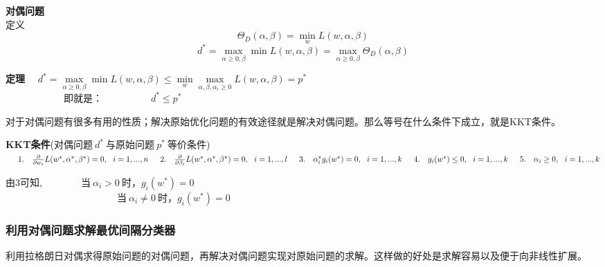 \textbf{对偶问题} ~~\\
\indent 定义
$$\Theta_D(\alpha,\beta)=\min \limits_w L(w,\alpha,\beta)$$
$$d^* = \max \limits_{\alpha\geq0,\beta} \min L(w,\alpha,\beta) = \max\limits_{\alpha\geq0,\beta} \Theta_D(\alpha,\beta)$$

\textbf{定理} ~~$d^* = \max \limits_{\alpha\geq0,\beta} \min L(w,\alpha,\beta)\leq \min \limits_w \max \limits_{\alpha,\beta,\alpha_i\geq0} L(w,\alpha,\beta) = p^*$ \\
\indent~~~~~~~~~~~~即就是：~~~~~~~~~~$d^*\leq p^*$

对于对偶问题有很多有用的性质；解决原始优化问题的有效途径就是解决对偶问题。那么等号在什么条件下成立，就是KKT条件。

\textbf{KKT条件}(对偶问题$~d^*~$与原始问题$~p^*~$等价条件)\\
$
\indent1.~~~\frac{\partial}{\partial w_i}L(w^*,\alpha^*,\beta^*) =0,~~i=1,...,n   \\
\indent2.~~~\frac{\partial}{\partial \beta_i}L(w^*,\alpha^*,\beta^*) =0,~~i=1,...,l  \\
\indent3.~~~\alpha_i^*g_i(w^*)=0,~~i=1,...,k\\
\indent4.~~~g_i(w^*)\leq0,~~i=1,...,k \\
\indent5.~~~\alpha_i\geq0,~~i=1,...,k
$

由3可知,~~~~~~~~当$~\alpha_i>0~$时，$g_i(w^*)=0$\\
\indent ~~~~~~~~~~~~~~~~~~~~~~~当$~\alpha_i\neq0~$时，$g_i(w^*)=0$

\subsubsection{利用对偶问题求解最优间隔分类器}
利用拉格朗日对偶求得原始问题的对偶问题，再解决对偶问题实现对原始问题的求解。这样做的好处是求解容易以及便于向非线性扩展。

